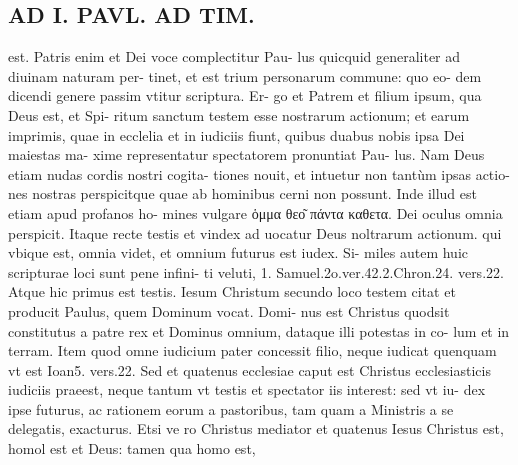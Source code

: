 \documentclass{article}
\begin{document}
\begin{pages}
\section*{AD I. PAVL. AD TIM. }
\marginpar{[ p.N ]}\pstart est. Patris enim et Dei voce complectitur Pau- lus quicquid generaliter ad diuinam naturam per- tinet, et est trium personarum commune: quo eo- dem dicendi genere passim vtitur scriptura. Er- go et Patrem et filium ipsum, qua Deus est, et Spi- ritum sanctum testem esse nostrarum actionum; et earum imprimis, quae in ecclelia et in iudiciis fiunt, quibus duabus nobis ipsa Dei maiestas ma- xime representatur spectatorem pronuntiat Pau- lus. Nam Deus etiam nudas cordis nostri cogita- tiones nouit, et intuetur non tantùm ipsas actio- nes nostras perspicitque quae ab hominibus cerni non possunt. Inde illud est etiam apud profanos ho- mines vulgare ὁμμα θεο͂ πάντα καθετα. Dei oculus omnia perspicit. Itaque recte testis et vindex ad uocatur Deus noltrarum actionum. qui vbique est, omnia videt, et omnium futurus est iudex. Si- miles autem huic scripturae loci sunt pene infini- ti veluti, 1. Samuel.2o.ver.42.2.Chron.24. vers.22. Atque hic primus est testis.  \pend\pstart Iesum Christum secundo loco testem citat et producit Paulus, quem Dominum vocat. Domi- nus est Christus quodsit constitutus a patre rex et Dominus omnium, dataque illi potestas in co- lum et in terram. Item quod omne iudicium pater concessit filio, neque iudicat quenquam vt est Ioan5. vers.22. Sed et quatenus ecclesiae caput est Christus ecclesiasticis iudiciis praeest, neque tantum vt testis et spectator iis interest: sed vt iu- dex ipse futurus, ac rationem eorum a pastoribus, tam quam a Ministris a se delegatis, exacturus. Etsi ve ro Christus mediator et quatenus Iesus Christus est, homol est et Deus: tamen qua homo est,  \pend

\end{pages}
\end{document}
